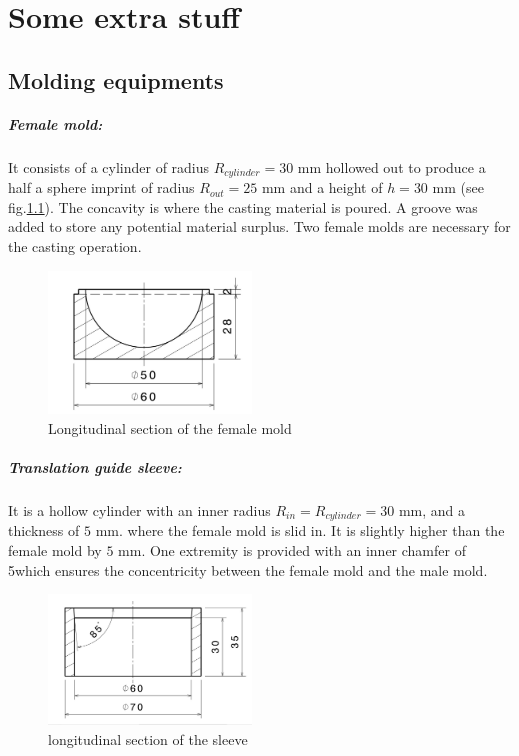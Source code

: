 \chapter{Some extra stuff}
\label{AppendixA}


\section{Molding equipments}

\paragraph{Female mold:}
It consists of a cylinder of radius $R_{cylinder}=30$ mm  hollowed out to produce a half a sphere imprint of radius $R_{out}=25$ mm and a height of $h = 30$ mm (see fig.\ref{fig:female_mold}). The concavity is where the casting material is poured.
A groove was added to store any potential material surplus. Two female molds are necessary for the casting operation.
\begin{figure}[H] %
	\centering%
		\includegraphics[width=0.48\textwidth]{figures/Chapter_1/female_mold.jpg}%
		\caption{Longitudinal section of the female mold}%
		\label{fig:female_mold}%
\end{figure}


\paragraph{Translation guide sleeve:}
It is a hollow cylinder with an inner radius $R_{in} = R_{cylinder} = 30$ mm, and a thickness of $5$ mm. where the female mold is slid in. It is slightly higher than the female mold by $5$ mm. One extremity is provided with an inner chamfer of 5\textdegree which ensures the concentricity between the female mold and the male mold.
\begin{figure}[H] %
	\centering%
  \includegraphics[width=0.48\textwidth]{figures/Chapter_1/sleeve_translation.jpg}
  \caption{longitudinal section of the sleeve}%
	\label{fig:sleeve_1}%
\end{figure}

